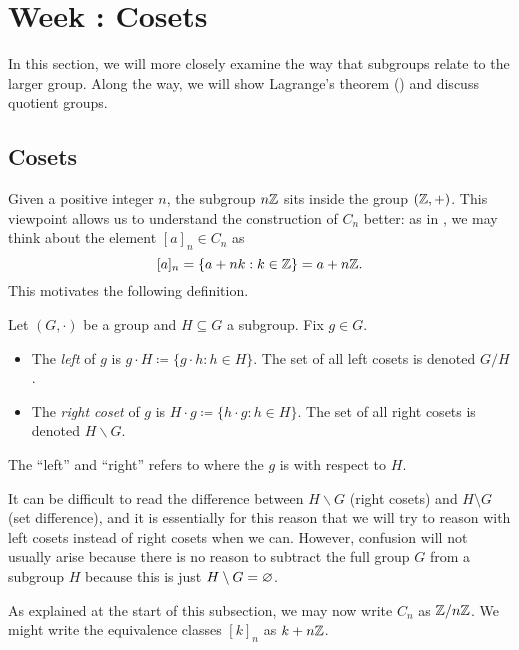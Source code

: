 \documentclass[../notes.tex]{subfiles}
\begin{document}
\section{Week \theweek: Cosets}
In this section, we will more closely examine the way that subgroups relate to the larger group. Along the way, we will show Lagrange's theorem () and discuss quotient groups.

\subsection{Cosets}
Given a positive integer $n$, the subgroup $n\mathbb Z$ sits inside the group $(\mathbb Z,+)$. This viewpoint allows us to understand the construction of $C_n$ better: as in , we may think about the element $[a]_n\in C_n$ as
\[[a]_n=\{a+nk:k\in\mathbb Z\}=a+n\mathbb Z.\]
This motivates the following definition.
\begin{definition}[coset]
    Let $(G,\cdot)$ be a group and $H\subseteq G$ a subgroup. Fix $g\in G$.
    \begin{itemize}
        \item The \textit{left } of $g$ is $g\cdot H\coloneqq\{g\cdot h:h\in H\}$. The set of all left cosets is denoted $G/H$.
        \item The \textit{right coset} of $g$ is $H\cdot g\coloneqq\{h\cdot g:h\in H\}$. The set of all right cosets is denoted $H\backslash G$.
    \end{itemize}
    The ``left'' and ``right'' refers to where the $g$ is with respect to $H$.
\end{definition}
It can be difficult to read the difference between $H\backslash G$ (right cosets) and $H\setminus G$ (set difference), and it is essentially for this reason that we will try to reason with left cosets instead of right cosets when we can. However, confusion will not usually arise because there is no reason to subtract the full group $G$ from a subgroup $H$ because this is just $H\setminus G=\varnothing$.
\begin{notation}
    As explained at the start of this subsection, we may now write $C_n$ as $\mathbb Z/n\mathbb Z$. We might write the equivalence classes $[k]_n$ as $k+n\mathbb Z$.
\end{notation}
\end{document}
